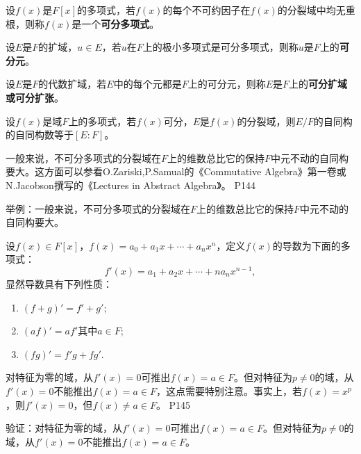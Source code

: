 \begin{definition}
	设$f(x)$是$F[x]$的多项式，若$f(x)$的每个不可约因子在$f(x)$的分裂域中均无重根，则称$f(x)$是一个\textbf{可分多项式}。
\end{definition}

\begin{definition}
	设$E$是$F$的扩域，$u\in E$，若$u$在$F$上的极小多项式是可分多项式，则称$u$是$F$上的\textbf{可分元}。
\end{definition}

\begin{definition}
	设$E$是$F$的代数扩域，若$E$中的每个元都是$F$上的可分元，则称$E$是$F$上的\textbf{可分扩域或可分扩张}。
\end{definition}


\begin{theorem}
	设$f(x)$是域$F$上的多项式，若$f(x)$可分，$E$是$f(x)$的分裂域，则$E/F$的自同构的自同构数等于$[E:F]$。
\end{theorem}

\original
{
	一般来说，不可分多项式的分裂域在$F$上的维数总比它的保持$F$中元不动的自同构要大。这方面可以参看O.Zariski,P.Samual的《Commutative Algebra》第一卷或N.Jacobson撰写的《Lectures in Abstract Algebra》。
}
{P144}
\begin{proposition}
	举例：一般来说，不可分多项式的分裂域在$F$上的维数总比它的保持$F$中元不动的自同构要大。
\end{proposition}


\begin{definition}
	设$f(x)\in F[x]$，$f(x)=a_{0}+a_{1}x+\cdots +a_{n}x^{n}$，定义$f(x)$的导数为下面的多项式：
	\begin{equation*}
		f'(x)=a_{1}+a_{2}x+\cdots +na_{n}x^{n-1},
	\end{equation*}
	显然导数具有下列性质：
	\begin{enumerate}
		\item $(f+g)'=f'+g'$;
		\item $(af)'=af'$其中$a\in F $;
		\item $(fg)'=f'g+fg' $.
	\end{enumerate}
\end{definition}

\original
{
	对特征为零的域，从$f'(x)=0$可推出$f(x)=a\in F$。但对特征为$p\neq 0$的域，从$f'(x)=0$不能推出$f(x)=a\in F$，这点需要特别注意。事实上，若$f(x)=x^{p}$，则$f'(x)=0$，但$f(x)\neq a\in F$。
}
{P145}

\begin{proposition}
	验证：对特征为零的域，从$f'(x)=0$可推出$f(x)=a\in F$。但对特征为$p\neq 0$的域，从$f'(x)=0$不能推出$f(x)=a\in F$。
\end{proposition}

